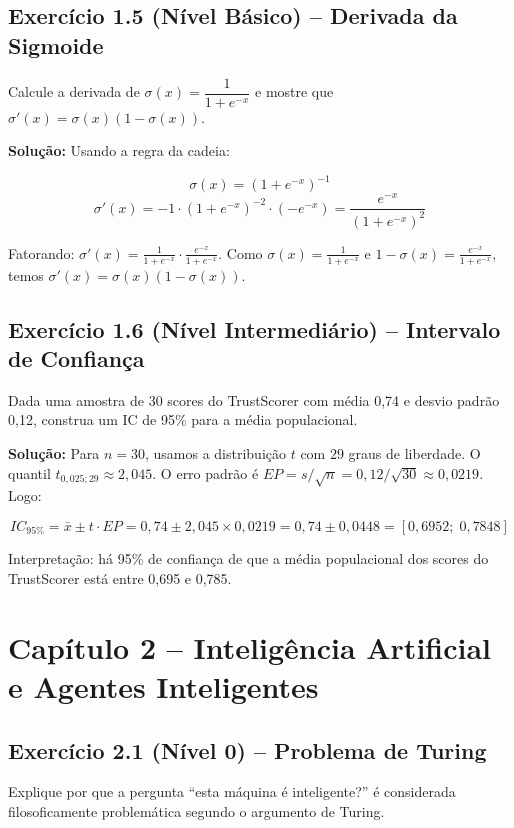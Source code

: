 \subsection*{Exercício 1.5 (Nível Básico) -- Derivada da Sigmoide}
Calcule a derivada de $\sigma(x) = \dfrac{1}{1 + e^{-x}}$ e mostre que
$\sigma'(x) = \sigma(x)(1 - \sigma(x))$.

\textbf{Solução:} Usando a regra da cadeia:

\[
\sigma(x) = (1 + e^{-x})^{-1}
\]
\[
\sigma'(x) = -1 \cdot (1 + e^{-x})^{-2} \cdot (-e^{-x})
= \frac{e^{-x}}{(1 + e^{-x})^2}
\]

Fatorando: $\sigma'(x) = \frac{1}{1 + e^{-x}} \cdot \frac{e^{-x}}{1 + e^{-x}}$.
Como $\sigma(x) = \frac{1}{1 + e^{-x}}$ e $1 - \sigma(x) = \frac{e^{-x}}{1 + e^{-x}}$,
temos $\sigma'(x) = \sigma(x)(1 - \sigma(x))$.

\subsection*{Exercício 1.6 (Nível Intermediário) -- Intervalo de Confiança}
Dada uma amostra de 30 scores do TrustScorer com média 0,74 e desvio
padrão 0,12, construa um IC de 95\% para a média populacional.

\textbf{Solução:} Para $n=30$, usamos a distribuição $t$ com $29$ graus de
liberdade. O quantil $t_{0,025; 29} \approx 2,045$. O erro padrão é
$EP = s / \sqrt{n} = 0,12 / \sqrt{30} \approx 0,0219$. Logo:

\[
IC_{95\%} = \bar{x} \pm t \cdot EP = 0,74 \pm 2,045 \times 0,0219
= 0,74 \pm 0,0448 = [0,6952;\; 0,7848]
\]

Interpretação: há 95\% de confiança de que a média populacional dos scores
do TrustScorer está entre 0,695 e 0,785.

\section*{Capítulo 2 -- Inteligência Artificial e Agentes Inteligentes}

\subsection*{Exercício 2.1 (Nível 0) -- Problema de Turing}
Explique por que a pergunta ``esta máquina é inteligente?'' é considerada
filosoficamente problemática segundo o argumento de Turing.

